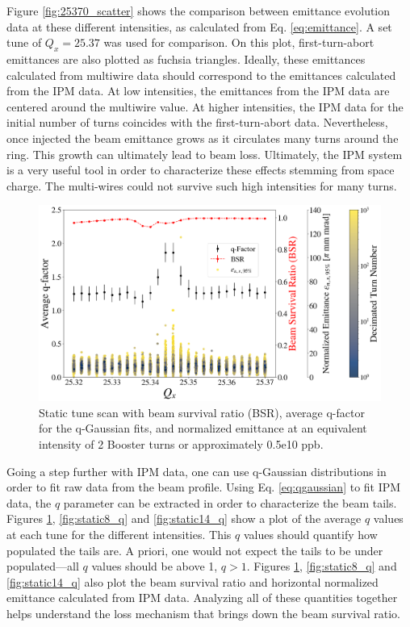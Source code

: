 Figure \ref{fig:25370_scatter} shows the comparison between emittance evolution data at these different intensities, as calculated from Eq. \ref{eq:emittance}. A set tune of $Q_x=25.37$ was used for comparison. On this plot, first-turn-abort emittances are also plotted as fuchsia triangles. Ideally, these emittances calculated from multiwire data should correspond to the emittances calculated from the IPM data. At low intensities, the emittances from the IPM data are centered around the multiwire value. At higher intensities, the IPM data for the initial number of turns coincides with the first-turn-abort data. Nevertheless, once injected the beam emittance grows as it circulates many turns around the ring. This growth can ultimately lead to beam loss. Ultimately, the IPM system is a very useful tool in order to characterize these effects stemming from space charge. The multi-wires could not survive such high intensities for many turns. 

\begin{figure}[H]
    \centering
    \includegraphics[width=\columnwidth]{chapter6/static2turns_emittance_dampersOFF.png}
    \caption{Static tune scan with beam survival ratio (BSR), average q-factor for the q-Gaussian fits, and normalized emittance at an equivalent intensity of 2 Booster turns or approximately 0.5e10 ppb.}
    \label{fig:static2_q}
\end{figure}

Going a step further with IPM data, one can use q-Gaussian distributions in order to fit raw data from the beam profile. Using Eq. \ref{eq:qgaussian} to fit IPM data, the $q$ parameter can be extracted in order to characterize the beam tails. Figures \ref{fig:static2_q}, \ref{fig:static8_q} and \ref{fig:static14_q} show a plot of the average $q$ values at each tune for the different intensities. This $q$ values should quantify how populated the tails are. A priori, one would not expect the tails to be under populated---all $q$ values should be above 1, $q>1$. Figures \ref{fig:static2_q}, \ref{fig:static8_q} and \ref{fig:static14_q} also plot the beam survival ratio and horizontal normalized emittance calculated from IPM data. Analyzing all of these quantities together helps understand the loss mechanism that brings down the beam survival ratio. 

